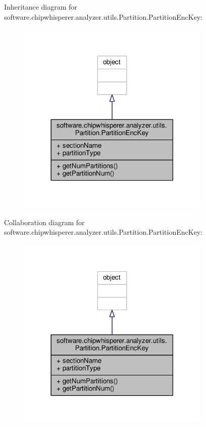 Inheritance diagram for software.\+chipwhisperer.\+analyzer.\+utils.\+Partition.\+Partition\+Enc\+Key\+:\nopagebreak
\begin{figure}[H]
\begin{center}
\leavevmode
\includegraphics[width=261pt]{d7/de3/classsoftware_1_1chipwhisperer_1_1analyzer_1_1utils_1_1Partition_1_1PartitionEncKey__inherit__graph}
\end{center}
\end{figure}


Collaboration diagram for software.\+chipwhisperer.\+analyzer.\+utils.\+Partition.\+Partition\+Enc\+Key\+:\nopagebreak
\begin{figure}[H]
\begin{center}
\leavevmode
\includegraphics[width=261pt]{de/d26/classsoftware_1_1chipwhisperer_1_1analyzer_1_1utils_1_1Partition_1_1PartitionEncKey__coll__graph}
\end{center}
\end{figure}


